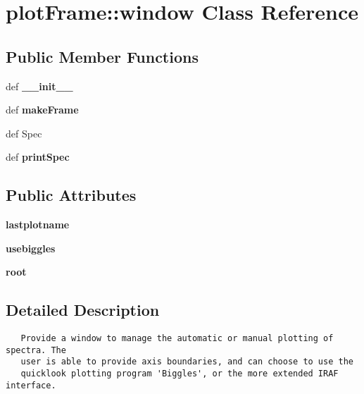 \section{plot\-Frame::window Class Reference}
\label{classplotFrame_1_1window}
\subsection*{Public Member Functions}
\begin{CompactItemize}
\item 
def \textbf{\_\-\_\-init\_\-\_\-}\label{classplotFrame_1_1window_cfaf753aae848029420c85559bde6251}

\item 
def \textbf{make\-Frame}\label{classplotFrame_1_1window_35d25d026b0d2a5876d569214fee02ab}

\item 
def {\bfplot\-Spec}
\item 
def \textbf{print\-Spec}\label{classplotFrame_1_1window_929ce03e4282b70d4d99bc4b688a8cc3}

\end{CompactItemize}
\subsection*{Public Attributes}
\begin{CompactItemize}
\item 
\textbf{lastplotname}\label{classplotFrame_1_1window_dc31634cec52cdb0487ccd5910e247d3}

\item 
\textbf{usebiggles}\label{classplotFrame_1_1window_2f73eb744ee20ec837b63ca26698c49b}

\item 
\textbf{root}\label{classplotFrame_1_1window_ce5b00741bbdb3736f69c3242f8acb9c}

\end{CompactItemize}


\subsection{Detailed Description}


\footnotesize\begin{verbatim}
   Provide a window to manage the automatic or manual plotting of spectra. The
   user is able to provide axis boundaries, and can choose to use the
   quicklook plotting program 'Biggles', or the more extended IRAF interface.
\end{verbatim}
\normalsize
 



